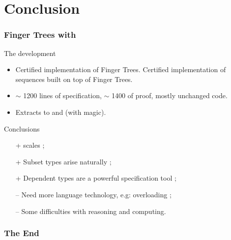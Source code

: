 \section*{Conclusion}
\begin{frame}
  \frametitle{Finger Trees with \Russell}
  
  \begin{block}{The development}
    \begin{itemize}
    \item Certified implementation of Finger Trees. 
      Certified implementation of sequences built on top of Finger Trees.
    \item $\sim$ 1200 lines of specification, $\sim$ 1400 of proof, mostly unchanged
      code.
    \item Extracts to \Haskell and \Ocaml (with magic).
    \end{itemize}
  \end{block}
  \pause
  \begin{block}{Conclusions}
    \begin{itemize}
    \item[+] \Program scales ;
    \item[+] Subset types arise naturally ;
    \item[+] Dependent types are a powerful specification tool ;      
    \item[--] Need more language technology, e.g: overloading ;
    \item[--] Some difficulties with reasoning and computing.
    \end{itemize}   
  \end{block}
  
\end{frame}

\begin{frame}
  \frametitle{The End}
\end{frame}



